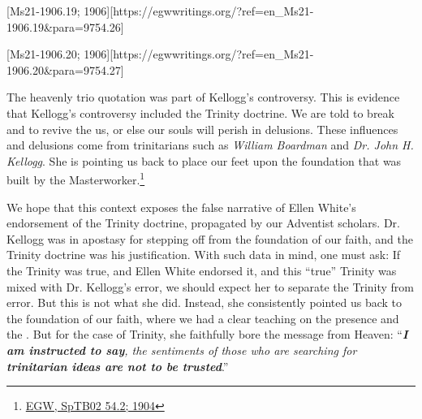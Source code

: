 [Ms21-1906.19; 1906][https://egwwritings.org/?ref=en\_Ms21-1906.19&para=9754.26]

[Ms21-1906.20; 1906][https://egwwritings.org/?ref=en\_Ms21-1906.20&para=9754.27]

The heavenly trio quotation was part of Kellogg's controversy. This is evidence that Kellogg’s controversy included the Trinity doctrine. We are told to break  and to revive the  us, or else our souls will perish in delusions. These influences and delusions come from trinitarians such as \textit{William Boardman} and \textit{Dr. John H. Kellogg}. She is pointing us back to place our feet upon the foundation that was built by the Masterworker.\footnote{\href{https://egwwritings.org/?ref=en_SpTB02.54.2&para=417.276}{EGW, SpTB02 54.2; 1904}}

We hope that this context exposes the false narrative of Ellen White's endorsement of the Trinity doctrine, propagated by our Adventist scholars. Dr. Kellogg was in apostasy for stepping off from the foundation of our faith, and the Trinity doctrine was his justification. With such data in mind, one must ask: If the Trinity was true, and Ellen White endorsed it, and this “true” Trinity was mixed with Dr. Kellogg's error, we should expect her to separate the Trinity from error. But this is not what she did. Instead, she consistently pointed us back to the foundation of our faith, where we had a clear teaching on the presence and the . But for the case of Trinity, she faithfully bore the message from Heaven: “\textit{\textbf{I am instructed to say}, the sentiments of those who are searching for \textbf{trinitarian ideas are not to be trusted}}.”

